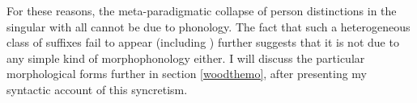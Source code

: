 \documentclass[output=paper,colorlinks,citecolor=brown,
]{langscibook}
\begin{document}
For these reasons, the meta-paradigmatic collapse of person distinctions in the singular with all \stvs cannot be due to phonology. The fact that such a heterogeneous class of suffixes fail to appear (including ) further suggests that it is not due to any simple kind of morphophonology either. I will discuss the particular morphological forms further in section \ref{woodthemo}, after presenting my syntactic account of this syncretism.







%

%


\end{document}
